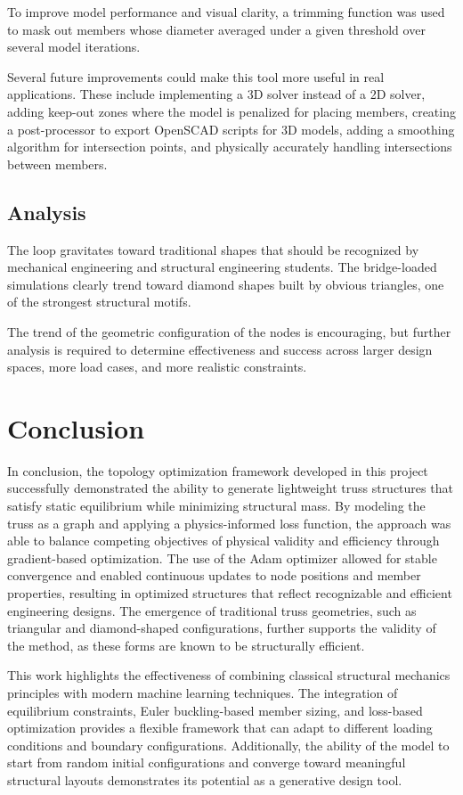 \documentclass[11pt]{article}
\begin{document}
To improve model performance and visual clarity, a trimming function was used to mask out members whose diameter averaged under a given threshold over several model iterations.

Several future improvements could make this tool more useful in real applications. These include implementing a 3D solver instead of a 2D solver, adding keep-out zones where the model is penalized for placing members, creating a post-processor to export OpenSCAD scripts for 3D models, adding a smoothing algorithm for intersection points, and physically accurately handling intersections between members.

\subsection{Analysis}

The loop gravitates toward traditional shapes that should be recognized by mechanical engineering and structural engineering students. The bridge-loaded simulations clearly trend toward diamond shapes built by obvious triangles, one of the strongest structural motifs.

The trend of the geometric configuration of the nodes is encouraging, but further analysis is required to determine effectiveness and success across larger design spaces, more load cases, and more realistic constraints.

\section{Conclusion}

In conclusion, the topology optimization framework developed in this project successfully demonstrated the ability to generate lightweight truss structures that satisfy static equilibrium while minimizing structural mass. By modeling the truss as a graph and applying a physics-informed loss function, the approach was able to balance competing objectives of physical validity and efficiency through gradient-based optimization. The use of the Adam optimizer allowed for stable convergence and enabled continuous updates to node positions and member properties, resulting in optimized structures that reflect recognizable and efficient engineering designs. The emergence of traditional truss geometries, such as triangular and diamond-shaped configurations, further supports the validity of the method, as these forms are known to be structurally efficient.

This work highlights the effectiveness of combining classical structural mechanics principles with modern machine learning techniques. The integration of equilibrium constraints, Euler buckling-based member sizing, and loss-based optimization provides a flexible framework that can adapt to different loading conditions and boundary configurations. Additionally, the ability of the model to start from random initial configurations and converge toward meaningful structural layouts demonstrates its potential as a generative design tool.
\end{document}
